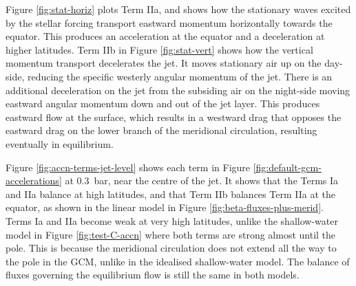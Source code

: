 Figure \ref{fig:stat-horiz} plots Term IIa, and shows how the stationary waves excited by the stellar forcing transport eastward momentum horizontally towards the equator. This produces an acceleration at the equator and a deceleration at higher latitudes. Term IIb in Figure \ref{fig:stat-vert} shows how the vertical momentum transport decelerates the jet. It moves stationary air up on the day-side, reducing the specific westerly angular momentum of the jet. There is an additional deceleration on the jet from the subsiding air on the night-side moving eastward angular momentum down and out of the jet layer. This produces eastward flow at the surface, which results in a westward drag that opposes the eastward drag on the lower branch of the meridional circulation, resulting eventually in equilibrium.


Figure \ref{fig:accn-terms-jet-level} shows each term in Figure \ref{fig:default-gcm-accelerations} at \SI{0.3}{\bar}, near the centre of the jet. It shows that the Terms Ia and IIa balance at high latitudes, and that Term IIb balances Term IIa at the equator, as shown in the linear model in Figure \ref{fig:beta-fluxes-plus-merid}. Terms Ia and IIa become weak at very high latitudes, unlike the shallow-water model in Figure \ref{fig:test-C-accn} where both terms are strong almost until the pole. This is because the meridional circulation does not extend all the way to the pole in the GCM, unlike in the idealised shallow-water model. The balance of fluxes governing the equilibrium flow is still the same in both models.

